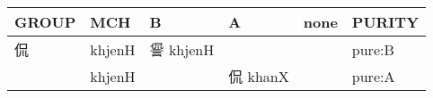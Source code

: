 \documentclass[14pt,a4paper]{scrartcl}
\begin{document}
\begin{longtable}[c]{@{}llllll@{}}
\toprule
\begin{minipage}[b]{0.14\columnwidth}\raggedright\strut
GROUP
\strut\end{minipage} &
\begin{minipage}[b]{0.14\columnwidth}\raggedright\strut
MCH
\strut\end{minipage} &
\begin{minipage}[b]{0.14\columnwidth}\raggedright\strut
B
\strut\end{minipage} &
\begin{minipage}[b]{0.14\columnwidth}\raggedright\strut
A
\strut\end{minipage} &
\begin{minipage}[b]{0.14\columnwidth}\raggedright\strut
none
\strut\end{minipage} &
\begin{minipage}[b]{0.14\columnwidth}\raggedright\strut
PURITY
\strut\end{minipage}\tabularnewline
\midrule
\endhead
\begin{minipage}[t]{0.14\columnwidth}\raggedright\strut
侃
\strut\end{minipage} &
\begin{minipage}[t]{0.14\columnwidth}\raggedright\strut
khjenH
\strut\end{minipage} &
\begin{minipage}[t]{0.14\columnwidth}\raggedright\strut
諐 khjenH
\strut\end{minipage} &
\begin{minipage}[t]{0.14\columnwidth}\raggedright\strut
\strut\end{minipage} &
\begin{minipage}[t]{0.14\columnwidth}\raggedright\strut
\strut\end{minipage} &
\begin{minipage}[t]{0.14\columnwidth}\raggedright\strut
pure:B
\strut\end{minipage}\tabularnewline
\begin{minipage}[t]{0.14\columnwidth}\raggedright\strut
𠈉
\strut\end{minipage} &
\begin{minipage}[t]{0.14\columnwidth}\raggedright\strut
khjenH
\strut\end{minipage} &
\begin{minipage}[t]{0.14\columnwidth}\raggedright\strut
\strut\end{minipage} &
\begin{minipage}[t]{0.14\columnwidth}\raggedright\strut
侃 khanX
\strut\end{minipage} &
\begin{minipage}[t]{0.14\columnwidth}\raggedright\strut
\strut\end{minipage} &
\begin{minipage}[t]{0.14\columnwidth}\raggedright\strut
pure:A
\strut\end{minipage}\tabularnewline
\bottomrule
\end{longtable}
\end{document}
